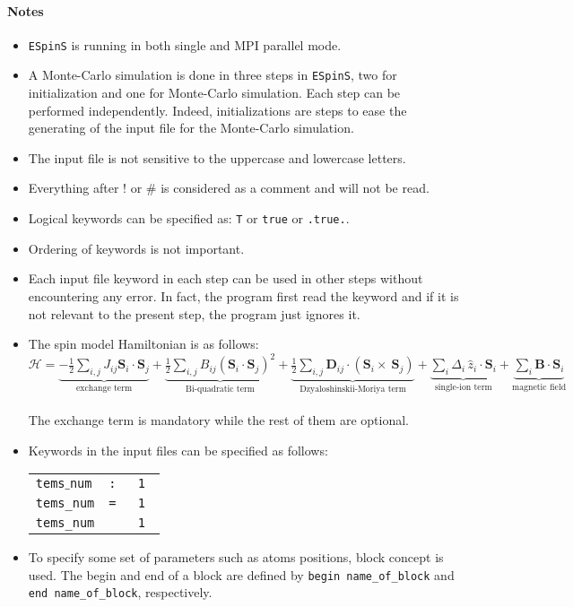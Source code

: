 \documentclass[10pt]{report}
\begin{document}
\paragraph{Notes}
\begin{itemize} %
\item {\tt ESpinS} is running in both single and MPI parallel mode. 
\item A Monte-Carlo simulation is done in three steps in {\tt ESpinS}, 
two for initialization and one for Monte-Carlo simulation.
 Each step can be performed independently. Indeed, initializations are steps to ease the generating of the input file for the Monte-Carlo simulation.
\item The input file is not sensitive to the uppercase and lowercase letters.
\item Everything after $!$ or $\#$ is considered as a comment and will not be read.
\item Logical keywords can be specified as: {\tt T} or {\tt true} or {\tt .true.}.
\item Ordering of keywords is not important.
\item  Each input file keyword in each step can be used in other steps without encountering any error. 
       In fact, the program first read the keyword and if it is not relevant to the present step, the program just ignores it.
\item The spin model Hamiltonian is as follows: \\
$\mathcal{H}=
\underbrace{-\frac{1}{2}\sum_{i,j}J_{ij}{\mathbf{S}_i\cdot\mathbf{S}_j}}_\text{exchange term}+
\underbrace{\frac{1}{2}\sum_{i,j}B_{ij}({\mathbf{S}_i\cdot\mathbf{S}_j})^2}_\text{Bi-quadratic term}+
\underbrace{\frac{1}{2}\sum_{i,j}\mathbf{D}_{ij}\cdot(\mathbf{S}_i\times~\mathbf{S}_j)}_\text{Dzyaloshinskii-Moriya term}+
\underbrace{\sum_{i}\Delta_i\,\hat{z}_i\cdot\mathbf{S}_i}_\text{single-ion term}+
\underbrace{\sum_{i}\mathbf{B}\cdot\mathbf{S}_i}_\text{magnetic field}$
\\
\\The exchange term is mandatory while the rest of them are optional.
\item Keywords in the input files can be specified as follows:\\
\begin{tabular}{lll}
    {\tt tems$\_$num} &\tt :&\tt 1 \\
    {\tt  tems\_num} &\tt = &\tt 1 \\
    {\tt tems\_num} & &\tt 1
\end{tabular}
\item To specify some set of parameters such as atoms positions, block concept is used. 
      The begin and end of a block are defined by {\tt begin name\_of\_block} and {\tt end name\_of\_block}, respectively.
\end{itemize}
\end{document}
